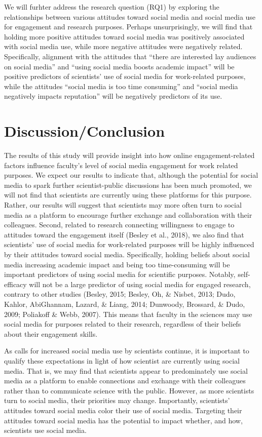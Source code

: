 \documentclass[12pt,]{article}
\begin{document}
We will furhter address the research question (RQ1) by exploring the relationships between various attitudes toward social media and social media use for engagement and research purposes. Perhaps unsurprisingly, we will find that holding more positive attitudes toward social media was positively associated with social media use, while more negative attitudes were negatively related. Specifically, alignment with the attitudes that ``there are interested lay audiences on social media'' and ``using social media boosts academic impact'' will be positive predictors of scientists' use of social media for work-related purposes, while the attitudes ``social media is too time consuming'' and ``social media negatively impacts reputation'' will be negatively predictors of its use.

\hypertarget{discussionconclusion}{%
\section{Discussion/Conclusion}\label{discussionconclusion}}

The results of this study will provide insight into how online engagement-related factors influence faculty's level of social media engagement for work related purposes. We expect our results to indicate that, although the potential for social media to spark further scientist-public discussions has been much promoted, we will not find that scientists are currently using these platforms for this purpose. Rather, our results will suggest that scientists may more often turn to social media as a platform to encourage further exchange and collaboration with their colleagues. Second, related to research connecting willingness to engage to attitudes toward the engagement itself (Besley et al., 2018), we also find that scientists' use of social media for work-related purposes will be highly influenced by their attitudes toward social media. Specifically, holding beliefs about social media increasing academic impact and being too time-consuming will be important predictors of using social media for scientific purposes. Notably, self-efficacy will not be a large predictor of using social media for engaged research, contrary to other studies (Besley, 2015; Besley, Oh, \& Nisbet, 2013; Dudo, Kahlor, AbiGhannam, Lazard, \& Liang, 2014; Dunwoody, Brossard, \& Dudo, 2009; Poliakoff \& Webb, 2007). This means that faculty in the sciences may use social media for purposes related to their research, regardless of their beliefs about their engagement skills.

As calls for increased social media use by scientists continue, it is important to qualify these expectations in light of how scientist are currently using social media. That is, we may find that scientists appear to predominately use social media as a platform to enable connections and exchange with their colleagues rather than to communicate science with the public. However, as more scientists turn to social media, their priorities may change. Importantly, scientists' attitudes toward social media color their use of social media. Targeting their attitudes toward social media has the potential to impact whether, and how, scientists use social media.

\printbibliography[title=References]
\end{document}
